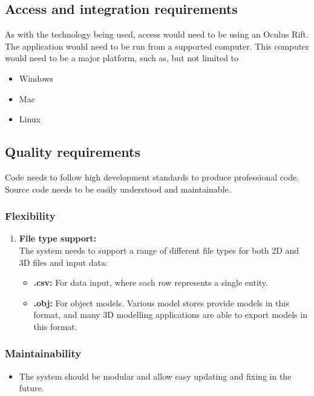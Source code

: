 \documentclass[a4paper,12pt]{article}
\begin{document}
\subsection{Access and integration requirements}
As with the technology being used, access would need to be using an Oculus Rift. \newline\newline The application would need to be run from a supported computer. This computer would need to be a major platform, such as, but not limited to
\begin{itemize}
	\item Windows
	\item Mac
	\item Linux
\end{itemize}

\subsection{Quality requirements}
Code needs to follow high development standards to produce professional code. Source code needs to be easily understood and maintainable.

\subsubsection{Flexibility}
\begin{enumerate}
	\item \textbf{File type support:}\\
	The system needs to support a range of different file types for both 2D and 3D files and input data:
	\begin{itemize}
		\item \textbf{.csv:} For data input, where each row represents a single entity.
		\item \textbf{.obj:} For object models. Various model stores provide models in this format, and many 3D modelling applications are able to export models in this format.
	\end{itemize}
\end{enumerate}


\subsubsection{Maintainability}
	\begin{itemize}
		\item The system should be modular and allow easy updating and fixing in the future.
	\end{itemize}
\end{document}
